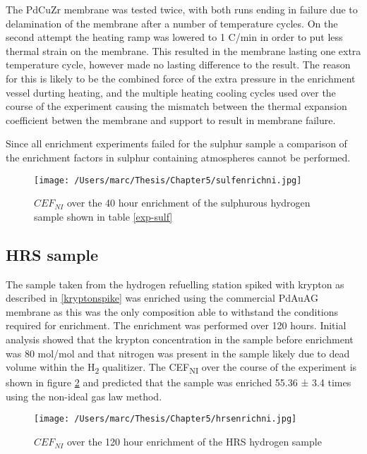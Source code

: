 The PdCuZr membrane was tested twice, with both runs ending in failure due to delamination of the membrane after a number of temperature cycles. On the second attempt the heating ramp was lowered to 1 \textdegree C/min in order to put less thermal strain on the membrane. This resulted in the membrane lasting one extra temperature cycle, however made no lasting difference to the result. The reason for this is likely to be the combined force of the extra pressure in the enrichment vessel durting heating, and the multiple heating cooling cycles used over the course of the experiment causing the mismatch between the thermal expansion coefficient betwen the membrane and support to result in membrane failure. 

Since all enrichment experiments failed for the sulphur sample a comparison of the enrichment factors in sulphur containing atmospheres cannot be performed. 

\begin{landscape}
    \begin{figure}
        \centering
        \texttt{[image: /Users/marc/Thesis/Chapter5/sulfenrichni.jpg]}
        \caption{$CEF_{NI}$ over the 40 hour enrichment of the sulphurous hydrogen sample shown in table \ref{exp-sulf}}
        \label{GCSULF}
    \end{figure}
\end{landscape}

\subsection{HRS sample}
The sample taken from the hydrogen refuelling station spiked with krypton as described in \ref{kryptonspike} was enriched using the commercial PdAuAG membrane as this was the only composition able to withstand the conditions required for enrichment. The enrichment was performed over 120 hours. Initial analysis showed that the krypton concentration in the sample before enrichment was 80 \textmu mol/mol and that nitrogen was present in the sample likely due to dead volume within the H\textsubscript{2} qualitizer. The CEF\textsubscript{NI} over the course of the experiment is shown in figure \ref{GCHRS} and predicted that the sample was enriched 55.36 ± 3.4 times using the non-ideal gas law method.

\begin{landscape}
    \begin{figure}
        \centering
        \texttt{[image: /Users/marc/Thesis/Chapter5/hrsenrichni.jpg]}
        \caption{$CEF_{NI}$ over the 120 hour enrichment of the HRS hydrogen sample}
        \label{GCHRS}
    \end{figure}
\end{landscape}

